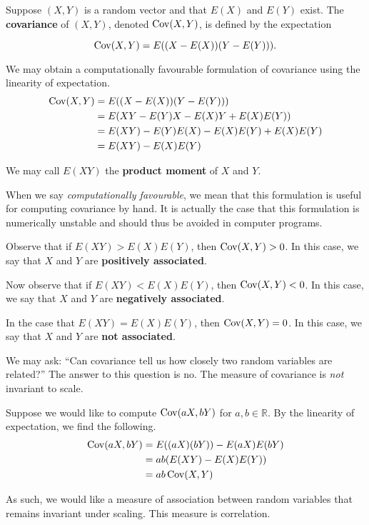 \begin{definition}[covariance]
	Suppose $(X,Y)$ is a random vector and that $E(X)$ and $E(Y)$ exist. The \textbf{covariance} of $(X,Y)$, denoted $\operatorname{Cov}(X,Y)$, is defined by the expectation

	$$\operatorname{Cov}(X,Y)=E((X-E(X))(Y-E(Y))).$$
\end{definition}

We may obtain a computationally favourable formulation of covariance using the linearity of expectation.
\begin{align*}
	\operatorname{Cov}(X,Y)&=E((X-E(X))(Y-E(Y)))\\
	&=E(XY-E(Y)X-E(X)Y+E(X)E(Y))\\
	&=E(XY)-E(Y)E(X)-E(X)E(Y)+E(X)E(Y)\\
	&=E(XY)-E(X)E(Y)
\end{align*}

We may call $E(XY)$ the \textbf{product moment} of $X$ and $Y$.

When we say \textit{computationally favourable}, we mean that this formulation is useful for computing covariance by hand. It is actually the case that this formulation is numerically unstable and should thus be avoided in computer programs.

Observe that if $E(XY)>E(X)E(Y)$, then $\operatorname{Cov}(X,Y)>0$. In this case, we say that $X$ and $Y$ are \textbf{positively associated}.

Now observe that if $E(XY)<E(X)E(Y)$, then $\operatorname{Cov}(X,Y)<0$. In this case, we say that $X$ and $Y$ are \textbf{negatively associated}.

In the case that $E(XY)=E(X)E(Y)$, then $\operatorname{Cov}(X,Y)=0$. In this case, we say that $X$ and $Y$ are \textbf{not associated}.

We may ask: ``Can covariance tell us how closely two random variables are related?'' The answer to this question is no. The measure of covariance is \textit{not} invariant to scale.

Suppose we would like to compute $\operatorname{Cov}(aX,bY)$ for $a,b\in\mathbb R$. By the linearity of expectation, we find the following.
\begin{align*}
	\operatorname{Cov}(aX,bY)&=E((aX)(bY))-E(aX)E(bY)\\
	&=ab(E(XY)-E(X)E(Y))\\
	&=ab\operatorname{Cov}(X,Y)
\end{align*}

As such, we would like a measure of association between random variables that remains invariant under scaling. This measure is correlation.


